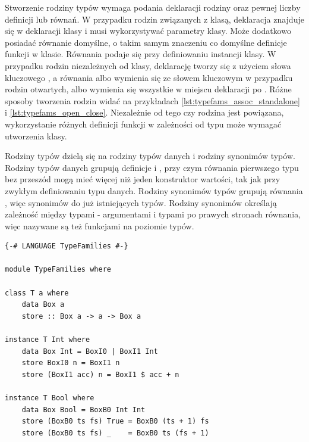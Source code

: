 {Stworzenie rodziny typów wymaga podania deklaracji rodziny oraz pewnej liczby
definicji lub równań. W przypadku rodzin związanych z klasą, deklaracja znajduje
się w deklaracji klasy i musi wykorzystywać parametry klasy.
Może dodatkowo
posiadać równanie domyślne, o takim samym znaczeniu co domyślne definicje
funkcji w klasie. Równania podaje się przy definiowaniu instancji klasy. W
przypadku rodzin niezależnych od klasy, deklarację tworzy się z użyciem słowa
kluczowego , a równania albo wymienia się ze słowem kluczowym
 w przypadku rodzin otwartych, albo wymienia się wszystkie w
miejscu deklaracji po . Różne sposoby tworzenia rodzin widać na
przykładach \ref{lst:typefams_assoc_standalone} i
\ref{lst:typefams_open_close}. Niezależnie od tego czy rodzina jest powiązana,
wykorzystanie różnych definicji funkcji w zależności od typu może wymagać
utworzenia klasy. 

Rodziny typów dzielą się na rodziny typów danych i rodziny synonimów
typów. Rodziny typów danych grupują definicje  i , przy
czym równania pierwszego typu bez przeszód mogą mieć więcej niż jeden
konstruktor wartości, tak jak przy zwykłym definiowaniu typu danych. Rodziny
synonimów typów grupują równania , więc synonimów do już istniejących
typów. Rodziny synonimów określają zależność między typami - argumentami i
typami po prawych stronach równania, więc nazywane są też funkcjami na poziomie
typów. 

\begin{lstlisting}[float,label={lst:typefams_assoc_standalone},
                   caption={Przykład pozwiązanej z klasą i niezależnej rodziny typów.}]
{-# LANGUAGE TypeFamilies #-}

module TypeFamilies where

class T a where
    data Box a
    store :: Box a -> a -> Box a

instance T Int where
    data Box Int = BoxI0 | BoxI1 Int
    store BoxI0 n = BoxI1 n
    store (BoxI1 acc) n = BoxI1 $ acc + n

instance T Bool where
    data Box Bool = BoxB0 Int Int
    store (BoxB0 ts fs) True = BoxB0 (ts + 1) fs
    store (BoxB0 ts fs) _    = BoxB0 ts (fs + 1)



\end{lstlisting}}
